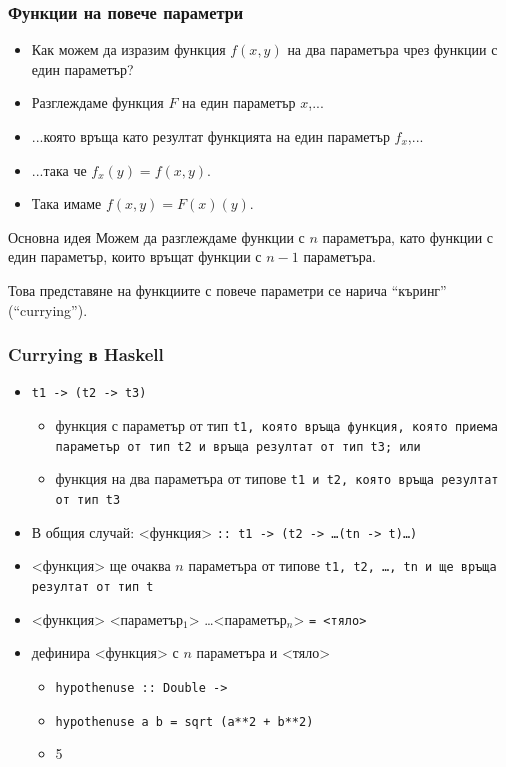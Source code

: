 \documentclass{beamer}
\begin{document}
\begin{frame}
  \frametitle{Функции на повече параметри}
  \begin{itemize}[<+->]
  \item Как можем да изразим функция $f(x,y)$ на два параметъра чрез функции с един параметър?
  \item Разглеждаме функция $F$ на един параметър $x$,...
  \item ...която връща като резултат функцията на един параметър $f_x$,...
  \item ...така че $f_x(y) = f(x,y)$.
  \item Така имаме $f(x,y) = F(x)(y)$.
  \end{itemize}
  \pause
  \begin{block}{Основна идея}
    Можем да разглеждаме функции с $n$ параметъра, като функции с един параметър, които връщат функции с $n-1$ параметъра.
  \end{block}
  \pause
  \alert{Това представяне на функциите с повече параметри се нарича ``къринг'' (``currying'').}
\end{frame}

\begin{frame}
  \frametitle{Currying в Haskell}
  \begin{itemize}[<+->]
  \item \tt{t1 \alert{->} (t2 \alert{->} t3)}
    \begin{itemize}
    \item функция с параметър от тип \tt{t1}, която връща функция, която приема параметър от тип \tt{t2} и връща резултат от тип \tt{t3}; или
    \item функция на два параметъра от типове \tt{t1} и \tt{t2}, която връща резултат от тип \tt{t3}
    \end{itemize}
  \item В общия случай: <функция> \tt{\alert{::} t1 \alert{->} (t2 \alert{->}} \ldots \tt{(tn \alert{->} t)}\ldots\tt)
  \item{} <функция> ще очаква $n$ параметъра от типове \tt{t1}, \tt{t2}, \ldots, \tt{tn} и ще връща резултат от тип \tt{t}
  \item{} <функция> <параметър$_1$> \ldots <параметър$_n$> \tt= <тяло>
  \item дефинира <функция> с $n$ параметъра и <тяло>
    \begin{itemize}
    \item \tt{hypothenuse :: Double -> }
    \item \tt{hypothenuse a b = sqrt (a**2 + b**2)}
    \item {}5
    \end{itemize}
  \end{itemize}
\end{frame}
\end{document}
